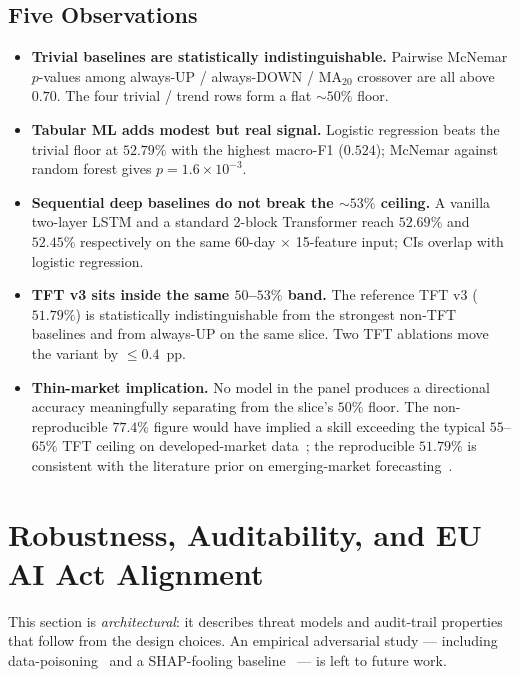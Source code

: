 \documentclass[conference]{IEEEtran}
\begin{document}
\subsection{Five Observations}

\begin{itemize}
\item \textbf{Trivial baselines are statistically indistinguishable.} Pairwise McNemar $p$-values among always-UP / always-DOWN / MA$_{20}$ crossover are all above $0.70$. The four trivial / trend rows form a flat $\sim\!50\%$ floor.
\item \textbf{Tabular ML adds modest but real signal.} Logistic regression beats the trivial floor at $52.79\%$ with the highest macro-F1 ($0.524$); McNemar against random forest gives $p = 1.6 \times 10^{-3}$.
\item \textbf{Sequential deep baselines do not break the $\sim\!53\%$ ceiling.} A vanilla two-layer LSTM and a standard 2-block Transformer reach $52.69\%$ and $52.45\%$ respectively on the same 60-day $\times$ 15-feature input; CIs overlap with logistic regression.
\item \textbf{TFT v3 sits inside the same $50$--$53\%$ band.} The reference TFT v3 ($51.79\%$) is statistically indistinguishable from the strongest non-TFT baselines and from always-UP on the same slice. Two TFT ablations move the variant by $\leq 0.4$~pp.
\item \textbf{Thin-market implication.} No model in the panel produces a directional accuracy meaningfully separating from the slice's $50\%$ floor. The non-reproducible $77.4\%$ figure would have implied a skill exceeding the typical $55$--$65\%$ TFT ceiling on developed-market data~\cite{IEEEhowto:kopka}; the reproducible $51.79\%$ is consistent with the literature prior on emerging-market forecasting~\cite{ref:bekaert_harvey,ref:harvey_multiple,ref:harvey_presidential}.
\end{itemize}

\section{Robustness, Auditability, and EU AI Act Alignment}\label{sec:security}

This section is \emph{architectural}: it describes threat models and audit-trail properties that follow from the design choices. An empirical adversarial study --- including data-poisoning~\cite{ref:data_poisoning} and a SHAP-fooling baseline~\cite{ref:slack_fooling} --- is left to future work.
\end{document}

